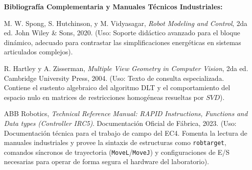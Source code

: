 \documentclass[11pt, letterpaper]{article}
\begin{document}
\vspace{0.4cm}
\textbf{Bibliografía Complementaria y Manuales Técnicos Industriales:}
\begin{enumerate}[label={[\arabic*]}, resume, leftmargin=*, nosep]
    \item M. W. Spong, S. Hutchinson, y M. Vidyasagar, \textit{Robot Modeling and Control}, 2da ed. John Wiley \& Sons, 2020. (Uso: Soporte didáctico avanzado para el bloque dinámico, adecuado para contrastar las simplificaciones energéticas en sistemas articulados complejos).
    
    \item R. Hartley y A. Zisserman, \textit{Multiple View Geometry in Computer Vision}, 2da ed. Cambridge University Press, 2004. (Uso: Texto de consulta especializada. Contiene el sustento algebraico del algoritmo DLT y el comportamiento del espacio nulo en matrices de restricciones homogéneas resueltas por $SVD$).
    
    \item ABB Robotics, \textit{Technical Reference Manual: RAPID Instructions, Functions and Data types (Controller IRC5)}. Documentación Oficial de Fábrica, 2023. (Uso: Documentación técnica para el trabajo de campo del EC4. Fomenta la lectura de manuales industriales y provee la sintaxis de estructuras como \texttt{robtarget}, comandos síncronos de trayectoria (\texttt{MoveL}/\texttt{MoveJ}) y configuraciones de E/S necesarias para operar de forma segura el hardware del laboratorio).
\end{enumerate}
\end{document}
